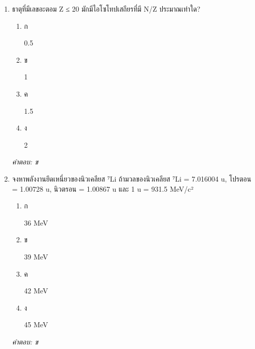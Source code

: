 \documentclass[12pt]{article}
\begin{document}
\begin{enumerate}[label=\arabic*., itemsep=0.5\baselineskip, topsep=0.5\baselineskip, leftmargin=*]
\item ธาตุที่มีเลขอะตอม Z ≤ 20 มักมีไอโซโทปเสถียรที่มี N/Z ประมาณเท่าใด?
\begin{enumerate}[label=\alph*)., itemsep=0.3\baselineskip, topsep=0.3\baselineskip]
\item ก\ 
\begin{minipage}[t]{0.9\linewidth}
\raggedright 0.5
\end{minipage}
\item ข\ 
\begin{minipage}[t]{0.9\linewidth}
\raggedright 1
\end{minipage}
\item ค\ 
\begin{minipage}[t]{0.9\linewidth}
\raggedright 1.5
\end{minipage}
\item ง\ 
\begin{minipage}[t]{0.9\linewidth}
\raggedright 2
\end{minipage}
\end{enumerate}
\vspace{-0.3\baselineskip}
\begin{small}
\textit{คำตอบ: ข}
\end{small}

\item จงหาพลังงานยึดเหนี่ยวของนิวเคลียส ⁷Li ถ้ามวลของนิวเคลียส ⁷Li = 7.016004 u, โปรตอน = 1.00728 u, นิวตรอน = 1.00867 u และ 1 u = 931.5 MeV/c²
\begin{enumerate}[label=\alph*)., itemsep=0.3\baselineskip, topsep=0.3\baselineskip]
\item ก\ 
\begin{minipage}[t]{0.9\linewidth}
\raggedright 36 MeV
\end{minipage}
\item ข\ 
\begin{minipage}[t]{0.9\linewidth}
\raggedright 39 MeV
\end{minipage}
\item ค\ 
\begin{minipage}[t]{0.9\linewidth}
\raggedright 42 MeV
\end{minipage}
\item ง\ 
\begin{minipage}[t]{0.9\linewidth}
\raggedright 45 MeV
\end{minipage}
\end{enumerate}
\vspace{-0.3\baselineskip}
\begin{small}
\textit{คำตอบ: ข}
\end{small}


\end{enumerate}
\end{document}
